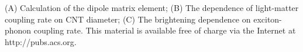 \documentclass[journal=aamick,manuscript=article]{achemso}
\begin{document}
\begin{suppinfo}
(A) Calculation of the dipole matrix element; (B) The dependence of light-matter coupling rate on CNT diameter; (C) The brightening dependence on exciton-phonon coupling rate. This material is available free of charge via the Internet at http://pubs.acs.org.
\end{suppinfo}






\end{document}
